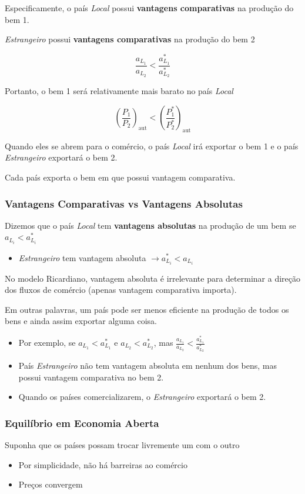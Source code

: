 \documentclass[a4paper,12pt]{article}[abntex2]
\begin{document}
Especificamente, o país \textit{Local} possui \textbf{vantagens comparativas} na produção do bem 1.

\textit{Estrangeiro} possui \textbf{vantagens comparativas} na produção do bem 2

\[
\frac{a_{L_1}}{a_{L_2}} < \frac{a^*_{L_1}}{a^*_{L_2}}
\]

Portanto, o bem 1 será relativamente mais barato no país \textit{Local}

\[
\left( \frac{P_1}{P_2} \right)_{\text{aut}} < \left( \frac{P_1^*}{P_2^*} \right)_{\text{aut}}
\]

Quando eles se abrem para o comércio, o país \textit{Local} irá exportar o bem 1 e o país \textit{Estrangeiro} exportará o bem 2.

Cada país exporta o bem em que possui vantagem comparativa.

\subsubsection{\textbf{Vantagens Comparativas vs Vantagens Absolutas}}
Dizemos que o país \textit{Local} tem \textbf{vantagens absolutas} na produção de um bem se 
\( a_{L_i} < a^*_{L_i} \)

\begin{itemize}
    \item \textit{Estrangeiro} tem vantagem absoluta \( \rightarrow a^*_{L_i} < a_{L_i} \)
\end{itemize}

No modelo Ricardiano, vantagem absoluta é irrelevante para determinar a direção dos fluxos de comércio (apenas vantagem comparativa importa).

Em outras palavras, um país pode ser menos eficiente na produção de todos os bens e ainda assim exportar alguma coisa.

\begin{itemize}
    \item Por exemplo, se \( a_{L_1} < a^*_{L_1} \) e \( a_{L_2} < a^*_{L_2} \), mas 
    \(
    \frac{a_{L_1}}{a_{L_2}} < \frac{a^*_{L_1}}{a^*_{L_2}}
    \)
    \item País \textit{Estrangeiro} não tem vantagem absoluta em nenhum dos bens, mas possui vantagem comparativa no bem 2.
    \item Quando os países comercializarem, o \textit{Estrangeiro} exportará o bem 2.
\end{itemize}

\subsubsection{\textbf{Equilíbrio em Economia Aberta}}
Suponha que os países possam trocar livremente um com o outro \begin{itemize}
    \item Por simplicidade, não há barreiras ao comércio
    \item Preços convergem
\end{itemize}
\end{document}
